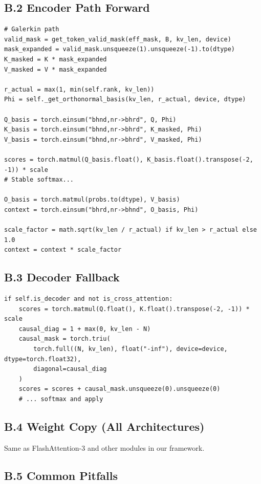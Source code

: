 \subsection{B.2 Encoder Path Forward}

\begin{lstlisting}
# Galerkin path
valid_mask = get_token_valid_mask(eff_mask, B, kv_len, device)
mask_expanded = valid_mask.unsqueeze(1).unsqueeze(-1).to(dtype)
K_masked = K * mask_expanded
V_masked = V * mask_expanded

r_actual = max(1, min(self.rank, kv_len))
Phi = self._get_orthonormal_basis(kv_len, r_actual, device, dtype)

Q_basis = torch.einsum("bhnd,nr->bhrd", Q, Phi)
K_basis = torch.einsum("bhnd,nr->bhrd", K_masked, Phi)
V_basis = torch.einsum("bhnd,nr->bhrd", V_masked, Phi)

scores = torch.matmul(Q_basis.float(), K_basis.float().transpose(-2, -1)) * scale
# Stable softmax...

O_basis = torch.matmul(probs.to(dtype), V_basis)
context = torch.einsum("bhrd,nr->bhnd", O_basis, Phi)

scale_factor = math.sqrt(kv_len / r_actual) if kv_len > r_actual else 1.0
context = context * scale_factor
\end{lstlisting}

\subsection{B.3 Decoder Fallback}

\begin{lstlisting}
if self.is_decoder and not is_cross_attention:
    scores = torch.matmul(Q.float(), K.float().transpose(-2, -1)) * scale
    causal_diag = 1 + max(0, kv_len - N)
    causal_mask = torch.triu(
        torch.full((N, kv_len), float("-inf"), device=device, dtype=torch.float32),
        diagonal=causal_diag
    )
    scores = scores + causal_mask.unsqueeze(0).unsqueeze(0)
    # ... softmax and apply
\end{lstlisting}

\subsection{B.4 Weight Copy (All Architectures)}

Same as FlashAttention-3 and other modules in our framework.

\subsection{B.5 Common Pitfalls}

